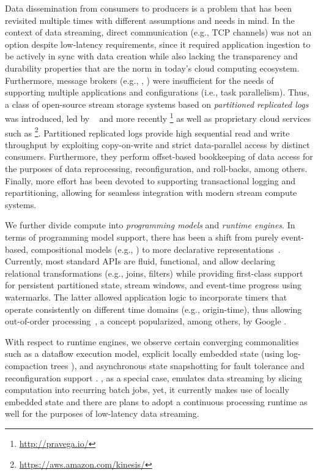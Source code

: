  Data dissemination from consumers to producers is a problem that has been revisited multiple times with different assumptions and needs in mind. In the context of data streaming, direct communication (e.g., TCP channels) was not an option despite low-latency requirements, since it required application ingestion to be actively in sync with data creation while also lacking the transparency and durability properties that are the norm in today's cloud computing ecosystem. Furthermore, message brokers (e.g., , ) were insufficient for the needs of supporting multiple applications and configurations (i.e., task parallelism). Thus, a class of open-source stream storage systems based on \emph{partitioned replicated logs} was introduced, led by ~\cite{kreps2011kafka} and more recently \footnote{\url{http://pravega.io/}} as well as proprietary cloud services such as \footnote{\url{https://aws.amazon.com/kinesis/}}. Partitioned replicated logs provide high sequential read and write throughput by exploiting copy-on-write and strict data-parallel access by distinct consumers. Furthermore, they perform offset-based bookkeeping of data access for the purposes of data reprocessing, reconfiguration, and roll-backs, among others. Finally, more effort has been devoted to supporting transactional logging and repartitioning, allowing for seamless integration with modern stream compute systems.

 We further divide compute into \emph{programming models} and \emph{runtime engines}. In terms of programming model support, there has been a shift from purely event-based, compositional models (e.g.,  \cite{toshniwal_et_al_2014}) to more declarative representations~\cite{carbone_et_al_2015,akidau2015dataflow,zaharia_et_al_2013}. Currently, most standard APIs are fluid, functional, and allow declaring relational transformations (e.g., joins, filters) while providing first-class support for persistent partitioned state, stream windows, and event-time prog\-ress using watermarks. The latter allowed application logic to incorporate timers that operate consistently on different time domains (e.g., origin-time), thus allowing out-of-order processing~\cite{li2008out},  a concept popularized, among others, by Google \cite{millwheel,akidau2015dataflow}.

With respect to runtime engines, we observe certain converging commonalities such as a dataflow execution model, explicit locally embedded state (using log-compaction trees \cite{CUSTOM:web/rocksdb}), and asynchronous state snapshotting for fault tolerance and reconfiguration support \cite{state2017carbone,jacques2016consistent}.  \cite{zaharia_et_al_2013}, as a special case, emulates data streaming by slicing computation into recurring batch jobs, yet, it currently makes use of locally embedded state and there are plans to adopt a continuous processing runtime as well for the purposes of low-latency data streaming.

